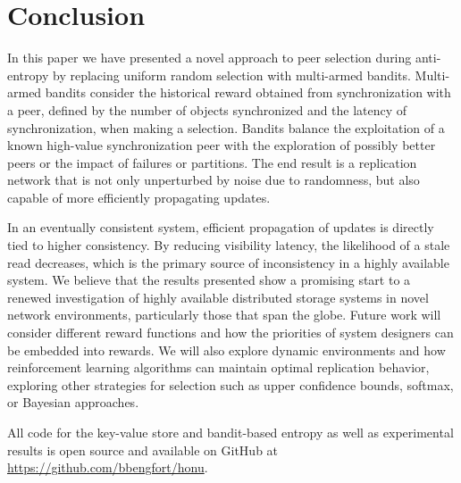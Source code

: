 \section*{Conclusion}

In this paper we have presented a novel approach to peer selection during
anti-entropy by replacing uniform random selection with multi-armed bandits.
Multi-armed bandits consider the historical reward obtained from
synchronization with a peer, defined by the number of objects synchronized
and the latency of synchronization, when making a selection.
Bandits balance the exploitation of a known high-value synchronization
peer with the exploration of possibly better peers or the impact of
failures or partitions.
The end result is a replication network that is not only unperturbed by noise
due to randomness, but also capable of more efficiently propagating updates.

In an eventually consistent system, efficient propagation of updates is
directly tied to higher consistency.
By reducing visibility latency, the likelihood of a stale read decreases, which is
the primary source of inconsistency in a highly available system.
We believe that the results presented show a promising start to a renewed
investigation of highly available distributed storage systems in novel
network environments, particularly those that span the globe.
Future work will consider different reward functions and how the priorities
of system designers can be embedded into rewards.
We will also explore dynamic environments and how reinforcement learning
algorithms can maintain optimal replication behavior, exploring other
strategies for selection such as upper confidence bounds, softmax, or
Bayesian approaches.

All code for the key-value store and bandit-based entropy as well as
experimental results is open source and available on GitHub at
\url{https://github.com/bbengfort/honu}.
